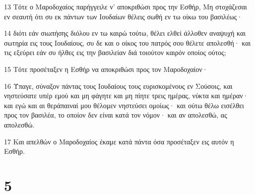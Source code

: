 \par 13 Τότε ο Μαροδοχαίος παρήγγειλε ν' αποκριθώσι προς την Εσθήρ, Μη στοχάζεσαι εν σεαυτή ότι συ εκ πάντων των Ιουδαίων θέλεις σωθή εν τω οίκω του βασιλέως·
\par 14 διότι εάν σιωπήσης διόλου εν τω καιρώ τούτω, θέλει ελθεί άλλοθεν αναψυχή και σωτηρία εις τους Ιουδαίους, συ δε και ο οίκος του πατρός σου θέλετε απολεσθή· και τις εξεύρει εάν συ ήλθες εις την βασιλείαν διά τοιούτον καιρόν οποίος ούτος;
\par 15 Τότε προσέταξεν η Εσθήρ να αποκριθώσι προς τον Μαροδοχαίον·
\par 16 Ύπαγε, σύναξον πάντας τους Ιουδαίους τους ευρισκομένους εν Σούσοις, και νηστεύσατε υπέρ εμού και μη φάγητε και μη πίητε τρεις ημέρας, νύκτα και ημέραν· και εγώ και αι θεράπαιναί μου θέλομεν νηστεύσει ομοίως· και ούτω θέλω εισέλθει προς τον βασιλέα, το οποίον δεν είναι κατά τον νόμον· και αν απολεσθώ, ας απολεσθώ.
\par 17 Και απελθών ο Μαροδοχαίος έκαμε κατά πάντα όσα προσέταξεν εις αυτόν η Εσθήρ.

\chapter{5}

